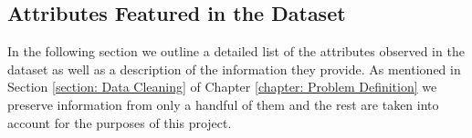 \subsection{Attributes Featured in the Dataset}
\label{subsection: Eliminated Attributes}
In the following section we outline a detailed list of the attributes observed in the dataset as well as a description of the information they provide. As mentioned in Section \ref{section: Data Cleaning} of Chapter \ref{chapter: Problem Definition} we preserve information from only a handful of them and the rest are taken into account for the purposes of this project.



